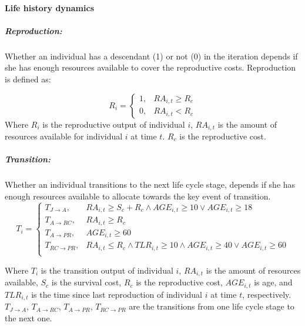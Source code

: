 \documentclass{article}
\begin{document}
\paragraph{Life history dynamics}

\subparagraph{Reproduction:}

Whether an individual has a descendant (1) or not (0) in the iteration depends if she has enough resources available to cover the reproductive costs. Reproduction is defined as:

\begin{equation}
    R_i=\begin{cases}
    1,& RA_{i,t} \geq R_c\\
    0,& RA_{i,t} < R_c
\end{cases}
\end{equation}
        Where $R_i$ is the reproductive output of individual $i$, $RA_{i,t}$ is the amount of resources available for individual $i$ at time $t$. $R_c$ is the reproductive cost.

\subparagraph{Transition:}
       
Whether an individual transitions to the next life cycle stage, depends if she has enough resources available to allocate towards the key event of transition.
\begin{equation}
    T_i=\begin{cases}
    T_{J \to A},& RA_{i,t} \geq S_c+R_c \wedge AGE_{i,t} \geq 10 \vee AGE_{i,t} \geq 18\\
   T_{A \to RC},& RA_{i,t} \geq R_c\\
   T_{A \to PR},& AGE_{i,t} \geq 60\\
   T_{RC \to PR},& RA_{i,t} \leq R_c \wedge TLR_{i,t} \geq 10 \wedge AGE_{i,t} \geq 40 \vee AGE_{i,t} \geq 60\\
\end{cases}
\end{equation}

Where $T_i$ is the transition output of individual $i$, $RA_{i,t}$ is the amount of resources available, $S_c$ is the survival cost, $R_c$ is the reproductive cost, $AGE_{i,t}$ is age, and $TLR_{i,t}$ is the time since last reproduction of individual $i$ at time $t$, respectively. $T_{J \to A}$, $T_{A \to RC}$, $T_{A \to PR}$, $T_{RC \to PR}$ are the transitions from one life cycle stage to the next one.
        
\end{document}
